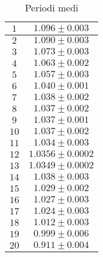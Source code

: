 \documentclass[a4paper,11pt,oneside]{article}
\begin{document}
\begin{table}[h!]
    \centering
    \begin{tabular}{|c|c|}
        \hline
        $1$ & $1.096\pm0.003$\\ \hline
        $2$ & $1.090\pm0.003$\\ \hline
        $3$ & $1.073\pm0.003$\\ \hline
        $4$ & $1.063\pm0.002$\\ \hline
        $5$ & $1.057\pm0.003$\\ \hline
        $6$ & $1.040\pm0.001$\\ \hline
        $7$ & $1.038\pm0.002$\\ \hline
        $8$ & $1.037\pm0.002$\\ \hline
        $9$ & $1.037\pm0.001$\\ \hline
        $10$ & $1.037\pm0.002$\\ \hline
        $11$ & $1.034\pm0.003$\\ \hline
        $12$ & $1.0356\pm0.0002$\\ \hline
        $13$ & $1.0349\pm0.0002$\\ \hline
        $14$ & $1.038\pm0.003$\\ \hline
        $15$ & $1.029\pm0.002$\\ \hline
        $16$ & $1.027\pm0.003$\\ \hline
        $17$ & $1.024\pm0.003$\\ \hline
        $18$ & $1.012\pm0.003$\\ \hline
        $19$ & $0.999\pm0.006$\\ \hline
        $20$ & $0.911\pm0.004$\\ \hline
    \end{tabular}
    \caption{Periodi medi}
    \label{tab:periodi_medi}
\end{table}

\end{document}
